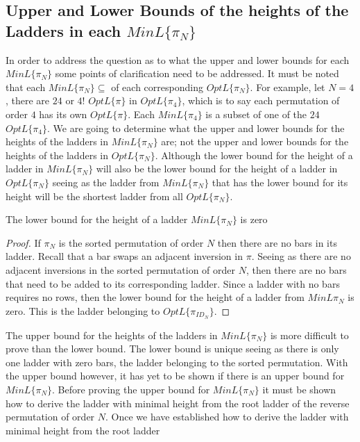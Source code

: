\subsection{Upper and Lower Bounds of the heights of the Ladders in each $MinL\{\pi_{N}\}$}
In order to address the question as to what the upper and lower bounds for each $MinL\{\pi_{N}\}$ 
some points of clarification need to be addressed. It must be noted that each $MinL\{\pi_{N}\} \subseteq$ of each
corresponding $OptL\{\pi_{N}\}$. For example, let $N=4$, there are $24$ or $4!$ $OptL\{\pi\}$ in $OptL\{\pi_{4}\}$, which is to say 
each permutation of order $4$ has its own $OptL\{\pi\}$. Each $MinL\{\pi_{4}\}$ is a subset of one of the $24$
$OptL\{\pi_{4}\}$. We are going to determine what the upper and lower bounds for the heights of the ladders in $MinL\{\pi_{N}\}$ are;
not the upper and lower bounds for the heights of the ladders in $OptL\{\pi_{N}\}$. Although the lower bound for the 
height of a ladder in $MinL\{\pi_{N}\}$ will also be the lower bound for the height of a ladder in $OptL\{\pi_{N}\}$
seeing as the ladder from $MinL\{\pi_{N}\}$ that has the lower bound for its height will be the shortest ladder 
from all $OptL\{\pi_{N}\}$.
\begin{lemma}
    The lower bound for the height of a ladder $MinL\{\pi_{N}\}$ is zero
\end{lemma} 
\begin{proof}
    If $\pi_{N}$ is the sorted permutation of order $N$ then there are no 
    bars in its ladder. Recall that a bar swaps an adjacent inversion in $\pi$.
    Seeing as there are no adjacent inversions in the sorted permutation of 
    order $N$, then there are no bars that need to be added to its corresponding 
    ladder. Since a ladder with no bars requires no rows, then the lower 
    bound for the height of a ladder from $MinL{\pi_{N}}$ is zero. This is 
    the ladder belonging to $OptL\{\pi_{ID_{N}}\}$.
\end{proof}\par 
The upper bound for the heights of the ladders in $MinL\{\pi_{N}\}$ is more difficult to prove than the lower bound. 
The lower bound is unique seeing as there is only one ladder with zero bars, the ladder belonging to 
the sorted permutation. With the upper bound however, it has yet to be shown if there is an upper bound for 
$MinL\{\pi_{N}\}$. Before proving the upper bound for $MinL\{\pi_{N}\}$ it must be shown how to 
derive the ladder with minimal height from the root ladder of the reverse permutation of order $N$.
Once we have established how to derive the ladder with minimal height from the root ladder 
